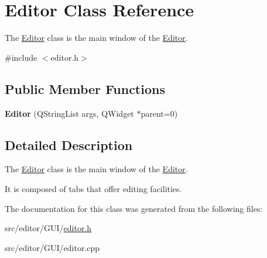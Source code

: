 \hypertarget{class_editor}{\section{\-Editor \-Class \-Reference}
\label{class_editor}
}


\-The \hyperlink{class_editor}{\-Editor} class is the main window of the \hyperlink{class_editor}{\-Editor}.  




{\ttfamily \#include $<$editor.\-h$>$}

\subsection*{\-Public \-Member \-Functions}
\begin{DoxyCompactItemize}
\item 
\hypertarget{class_editor_a7332320d22be46fb91bf0471dac0279b}{{\bfseries \-Editor} (\-Q\-String\-List args, \-Q\-Widget $\ast$parent=0)}\label{class_editor_a7332320d22be46fb91bf0471dac0279b}

\end{DoxyCompactItemize}


\subsection{\-Detailed \-Description}
\-The \hyperlink{class_editor}{\-Editor} class is the main window of the \hyperlink{class_editor}{\-Editor}. 

\-It is composed of tabs that offer editing facilities. 

\-The documentation for this class was generated from the following files\-:\begin{DoxyCompactItemize}
\item 
src/editor/\-G\-U\-I/\hyperlink{editor_8h}{editor.\-h}\item 
src/editor/\-G\-U\-I/editor.\-cpp\end{DoxyCompactItemize}
